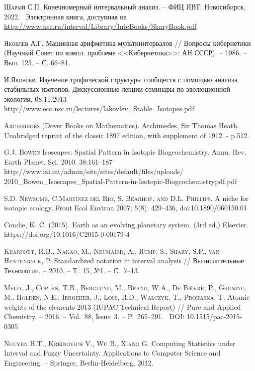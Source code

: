 \documentclass[a5paper,openany]{book}
\begin{document}
\begin{thebibliography}{00}
	\textsc{Шарый С.П.} Конечномерный интервальный анализ. -- ФИЦ ИВТ: 
	Новосибирск, 2022. \     Электронная книга, доступная 
	на \url{http://www.nsc.ru/interval/Library/InteBooks/SharyBook.pdf} 

	\textsc{Яковлев А.Г.} Машинная арифметика мультиинтервалов // Вопросы кибернетики
	(Научный Совет по компл. проблеме <<Кибернетика>>: АН СССР). – 1986. – Вып. 125. –
	С. 66–81.

	  \textsc{И.Яковлев.} Изучение трофической структуры сообществ с помощью анализа стабильных изотопов. Дискуссионные лекции-семинары по эволюционной экологии, 08.11.2013 \\
	http://www.eco.nsc.ru/lectures/Iakovlev\_Stable\_Isotopes.pdf
	
 \textsc{Archimedes}
(Dover Books on Mathematics). 
Archimedes, Sir Thomas Heath. Unabridged reprint of the classic 1897 edition, with supplement of 1912. - p.512.

	
	\textsc{G.J. Bowen} Isoscapes: Spatial Pattern in Isotopic Biogeochemistry.  Annu. Rev. Earth Planet. Sci. 2010. 38:161–187 \\
	http://www.iai.int/admin/site/sites/default/files/uploads/ 2010\_Bowen\_Isoscapes\_Spatial-Pattern-in-Isotopic-Biogeochemistrypdf.pdf

	 \textsc{S.D. Newsome, C.Martinez del Rio, S. Bearhop, and D.L. Phillips.}
	A niche for isotopic ecology. Front Ecol Environ 2007; 5(8): 429–436, doi:10.1890/060150.01

	Condie, K. C. (2015). Earth as an evolving planetary system. (3rd ed.) Elsevier. \\ https://doi.org/10.1016/C2015-0-00179-4
	
	\textsc{Kearfott, R.B., Nakao, M., Neumaier, A., Rump, S., Shary, S.P., van Hentenryck, 
		P.} Standardized notation in interval analysis // Вычислительные Технологии. -- 
	2010. -- Т.~15, №1. -- С.~7--13. 
	
	\textsc{Meija, J., Coplen, T.B., Berglund, M., Brand, W.A., De Bièvre, P., 
		Gröning, M., Holden, N.E., Irrgeher, J., Loss, R.D., Walczyk, T., Prohaska, T.} 
	Atomic weights of the elements 2013 (IUPAC Technical Report) // Pure and Applied 
	Chemistry. -- 2016. -- Vol.~88, Issue~3. -- P.~265--291. \   DOI: 10.1515/pac-2015-0305 
	

	\textsc{Nguyen H.T., Kreinovich V., Wu B., Xiang G.} Computing Statistics 
	under Interval and Fuzzy Uncertainty. Applications to Computer Science and Engineering. 
	-- Springer, Berlin-Heidelberg, 2012. 
	

\end{thebibliography}
\end{document}
